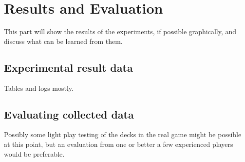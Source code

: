 \chapter{Results and Evaluation}
\label{ch:results}
This part will show the results of the experiments, if possible graphically, and discuss what can be learned from them.

\section{Experimental result data}
\label{ch:results:data}
Tables and logs mostly. 

\section{Evaluating collected data}
\label{ch:results:eval}
Possibly some light play testing of the decks in the real game might be possible at this point, but an evaluation from one or better a few experienced players would be preferable.